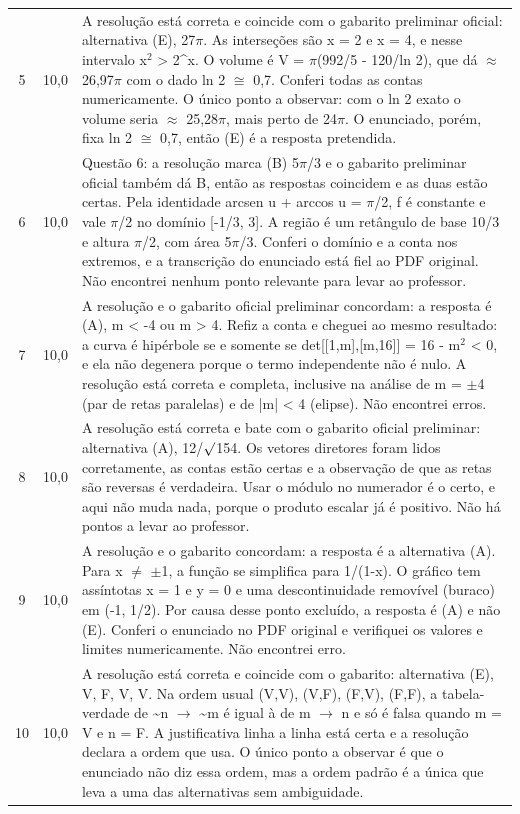 \documentclass{article}%
\begin{document}
\begin{longtable}{@{}c c p{}@{}}
5 & 10,0 & A resolução está correta e coincide com o gabarito preliminar oficial: alternativa (E), 27$\pi$. As interseções são x = 2 e x = 4, e nesse intervalo x$^2$ > 2\^{}x. O volume é V = $\pi$(992/5 - 120/ln 2), que dá $\approx$ 26,97$\pi$ com o dado ln 2 $\cong$ 0,7. Conferi todas as contas numericamente. O único ponto a observar: com o ln 2 exato o volume seria $\approx$ 25,28$\pi$, mais perto de 24$\pi$. O enunciado, porém, fixa ln 2 $\cong$ 0,7, então (E) é a resposta pretendida. \\
6 & 10,0 & Questão 6: a resolução marca (B) 5$\pi$/3 e o gabarito preliminar oficial também dá B, então as respostas coincidem e as duas estão certas. Pela identidade arcsen u + arccos u = $\pi$/2, f é constante e vale $\pi$/2 no domínio {[}{-}1/3, 3{]}. A região é um retângulo de base 10/3 e altura $\pi$/2, com área 5$\pi$/3. Conferi o domínio e a conta nos extremos, e a transcrição do enunciado está fiel ao PDF original. Não encontrei nenhum ponto relevante para levar ao professor. \\
7 & 10,0 & A resolução e o gabarito oficial preliminar concordam: a resposta é (A), m < -4 ou m > 4. Refiz a conta e cheguei ao mesmo resultado: a curva é hipérbole se e somente se det{[}{[}1,m{]},{[}m,16{]}{]} = 16 - m$^2$ < 0, e ela não degenera porque o termo independente não é nulo. A resolução está correta e completa, inclusive na análise de m = $\pm$4 (par de retas paralelas) e de |m| < 4 (elipse). Não encontrei erros. \\
8 & 10,0 & A resolução está correta e bate com o gabarito oficial preliminar: alternativa (A), 12/$\surd$154. Os vetores diretores foram lidos corretamente, as contas estão certas e a observação de que as retas são reversas é verdadeira. Usar o módulo no numerador é o certo, e aqui não muda nada, porque o produto escalar já é positivo. Não há pontos a levar ao professor. \\
9 & 10,0 & A resolução e o gabarito concordam: a resposta é a alternativa (A). Para x $\neq$ $\pm$1, a função se simplifica para 1/(1-x). O gráfico tem assíntotas x = 1 e y = 0 e uma descontinuidade removível (buraco) em (-1, 1/2). Por causa desse ponto excluído, a resposta é (A) e não (E). Conferi o enunciado no PDF original e verifiquei os valores e limites numericamente. Não encontrei erro. \\
10 & 10,0 & A resolução está correta e coincide com o gabarito: alternativa (E), V, F, V, V. Na ordem usual (V,V), (V,F), (F,V), (F,F), a tabela{-}verdade de \textasciitilde{}n $\to$ \textasciitilde{}m é igual à de m $\to$ n e só é falsa quando m = V e n = F. A justificativa linha a linha está certa e a resolução declara a ordem que usa. O único ponto a observar é que o enunciado não diz essa ordem, mas a ordem padrão é a única que leva a uma das alternativas sem ambiguidade. \\

\end{longtable}
\end{document}
